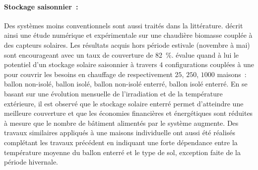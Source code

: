 \paragraph{Stockage saisonnier~:} %
\label{par:stockage_saisonnier}
Des systèmes moins conventionnels sont aussi traités dans la littérature.
\textcite{Hartl2012623} décrit ainsi une étude numérique et expérimentale sur une
chaudière biomasse couplée à des capteurs solaires. Les résultats acquis hors période
estivale (novembre à mai) sont encourageant avec un taux de couverture de
\SI{82}{\percent}. \textcite{Ucar20082532} évalue quand à lui le potentiel d’un stockage
solaire saisonnier à travers $4$ configurations couplées à une  pour couvrir les
besoins en chauffage de respectivement $25$, $250$, $1000$ maisons~: ballon non-isolé,
ballon isolé, ballon non-isolé enterré, ballon isolé enterré. En se basant sur une
évolution mensuelle de l’irradiation et de la température extérieure, il est observé que
le stockage solaire enterré permet d’atteindre une meilleure couverture et que les
économies financières et énergétiques sont réduites à mesure que le nombre de bâtiment
alimentés par le système augmente. Des travaux similaires appliqués à une maisons
individuelle ont aussi été réalisés \parencite{Yumrutas2012983} complétant les travaux
précédent en indiquant une forte dépendance entre la température moyenne du ballon enterré
et le type de sol, exception faite de la période hivernale.


